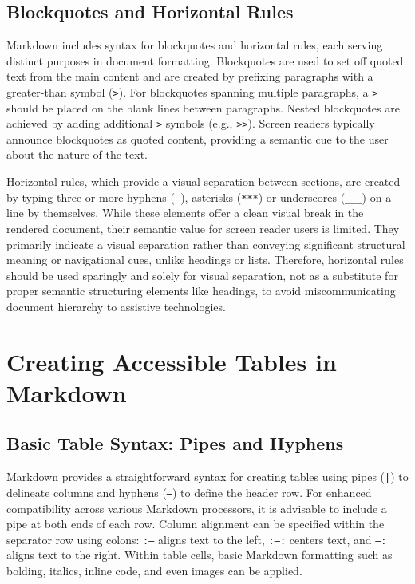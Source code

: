 \subsection{Blockquotes and Horizontal Rules}
Markdown includes syntax for blockquotes and horizontal rules, each serving distinct purposes in document formatting. Blockquotes are used to set off quoted text from the main content and are created by prefixing paragraphs with a greater-than symbol (\texttt{>}).\cite{MarkdownGuide} For blockquotes spanning multiple paragraphs, a \texttt{>} should be placed on the blank lines between paragraphs.\cite{MarkdownGuide} Nested blockquotes are achieved by adding additional \texttt{>} symbols (e.g., \texttt{>>}).\cite{MarkdownGuide} Screen readers typically announce blockquotes as quoted content, providing a semantic cue to the user about the nature of the text.

Horizontal rules, which provide a visual separation between sections, are created by typing three or more hyphens (\texttt{---}), asterisks (\texttt{***}) or underscores (\texttt{\_\_\_}) on a line by themselves.\cite{MarkdownGuide} While these elements offer a clean visual break in the rendered document, their semantic value for screen reader users is limited. They primarily indicate a visual separation rather than conveying significant structural meaning or navigational cues, unlike headings or lists.\cite{MSPowerShellMarkdown} Therefore, horizontal rules should be used sparingly and solely for visual separation, not as a substitute for proper semantic structuring elements like headings, to avoid miscommunicating document hierarchy to assistive technologies.

\section{Creating Accessible Tables in Markdown}
\label{sec:markdown-tables}

\subsection{Basic Table Syntax: Pipes and Hyphens}
Markdown provides a straightforward syntax for creating tables using pipes (\texttt{|}) to delineate columns and hyphens (\texttt{---}) to define the header row.\cite{DocsToMarkdown,MarkdownGuideExtended} For enhanced compatibility across various Markdown processors, it is advisable to include a pipe at both ends of each row.\cite{DocsToMarkdown} Column alignment can be specified within the separator row using colons: \texttt{:---} aligns text to the left, \texttt{:---:} centers text, and \texttt{---:} aligns text to the right.\cite{DocsToMarkdown} Within table cells, basic Markdown formatting such as bolding, italics, inline code, and even images can be applied.\cite{DocsToMarkdown}

